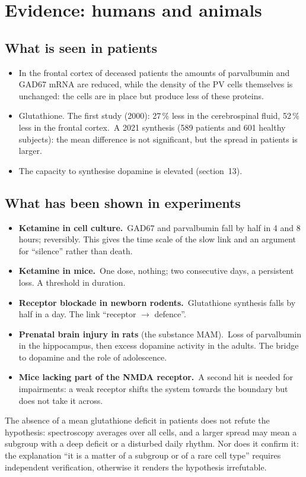 \section{Evidence: humans and animals}
\subsection{What is seen in patients}
\begin{itemize}
\item In the frontal cortex of deceased patients the amounts of parvalbumin and GAD67 mRNA are reduced, while the density of the PV cells themselves is unchanged: the cells are in place but produce less of these proteins.\tP
\item Glutathione. The first study (2000): 27\,\% less in the cerebrospinal fluid, 52\,\% less in the frontal cortex.\tS\ A 2021 synthesis (589 patients and 601 healthy subjects): the mean difference is not significant, but the spread in patients is larger.\tS
\item The capacity to synthesise dopamine is elevated (section~13).\tP
\end{itemize}
\subsection{What has been shown in experiments}
\begin{itemize}
\item \textbf{Ketamine in cell culture.}\tS\ GAD67 and parvalbumin fall by half in 4 and 8 hours; reversibly. This gives the time scale of the slow link and an argument for ``silence'' rather than death.
\item \textbf{Ketamine in mice.}\tS\ One dose, nothing; two consecutive days, a persistent loss. A threshold in duration.
\item \textbf{Receptor blockade in newborn rodents.}\tS\ Glutathione synthesis falls by half in a day. The link ``receptor $\to$ defence''.
\item \textbf{Prenatal brain injury in rats} (the substance MAM).\tS\ Loss of parvalbumin in the hippocampus, then excess dopamine activity in the adults. The bridge to dopamine and the role of adolescence.
\item \textbf{Mice lacking part of the NMDA receptor.}\tS\ A second hit is needed for impairments: a weak receptor shifts the system towards the boundary but does not take it across.
\end{itemize}
\begin{note}
The absence of a mean glutathione deficit in patients does not refute the hypothesis: spectroscopy averages over all cells, and a larger spread may mean a subgroup with a deep deficit or a disturbed daily rhythm. Nor does it confirm it: the explanation ``it is a matter of a subgroup or of a rare cell type'' requires independent verification, otherwise it renders the hypothesis irrefutable.
\end{note}
